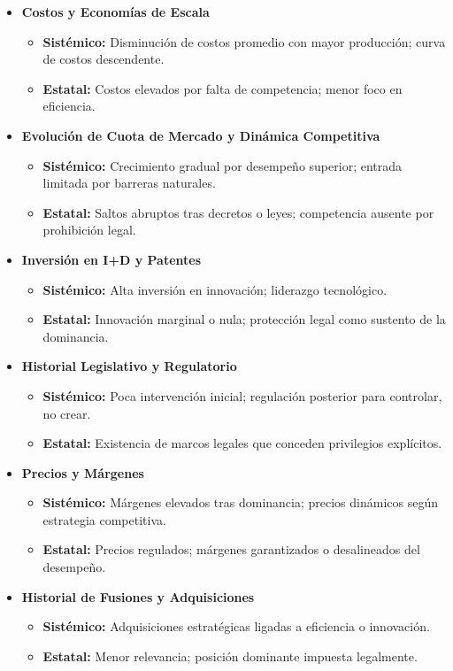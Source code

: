 \documentclass[a4paper,12pt]{article}
\begin{document}
\begin{itemize}
    \item \textbf{Costos y Economías de Escala}
    \begin{itemize}
        \item \textbf{Sistémico:} Disminución de costos promedio con mayor producción; curva de costos descendente.
        \item \textbf{Estatal:} Costos elevados por falta de competencia; menor foco en eficiencia.
    \end{itemize}

    \item \textbf{Evolución de Cuota de Mercado y Dinámica Competitiva}
    \begin{itemize}
        \item \textbf{Sistémico:} Crecimiento gradual por desempeño superior; entrada limitada por barreras naturales.
        \item \textbf{Estatal:} Saltos abruptos tras decretos o leyes; competencia ausente por prohibición legal.
    \end{itemize}

    \item \textbf{Inversión en I+D y Patentes}
    \begin{itemize}
        \item \textbf{Sistémico:} Alta inversión en innovación; liderazgo tecnológico.
        \item \textbf{Estatal:} Innovación marginal o nula; protección legal como sustento de la dominancia.
    \end{itemize}

    \item \textbf{Historial Legislativo y Regulatorio}
    \begin{itemize}
        \item \textbf{Sistémico:} Poca intervención inicial; regulación posterior para controlar, no crear.
        \item \textbf{Estatal:} Existencia de marcos legales que conceden privilegios explícitos.
    \end{itemize}

    \item \textbf{Precios y Márgenes}
    \begin{itemize}
        \item \textbf{Sistémico:} Márgenes elevados tras dominancia; precios dinámicos según estrategia competitiva.
        \item \textbf{Estatal:} Precios regulados; márgenes garantizados o desalineados del desempeño.
    \end{itemize}

    \item \textbf{Historial de Fusiones y Adquisiciones}
    \begin{itemize}
        \item \textbf{Sistémico:} Adquisiciones estratégicas ligadas a eficiencia o innovación.
        \item \textbf{Estatal:} Menor relevancia; posición dominante impuesta legalmente.
    \end{itemize}
\end{itemize}
\end{document}
